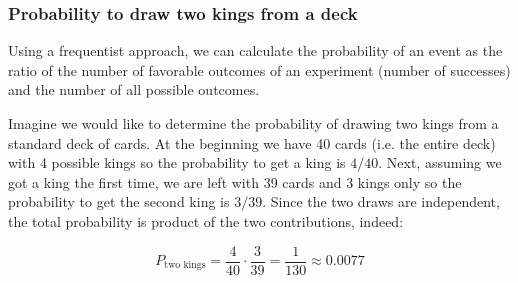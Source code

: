 \subsubsection{Probability to draw two kings from a deck}
Using a frequentist approach, we can calculate the
probability of an event as the ratio of the number of favorable outcomes
of an experiment (number of successes) and the number of all possible
outcomes. 

Imagine we would like to determine the probability of drawing two kings from a standard deck of cards.
At the beginning we have 40 cards (i.e. the entire deck) with 4 possible kings so the probability to get a king
is $4/40$. Next, assuming we got a king the first time, we are left with 39 cards and 3 kings only so the 
probability to get the second king is $3/39$. Since the two draws are independent, the total probability 
is product of the two contributions, indeed:

\[P_\textrm{two kings} = \frac{4}{40} \cdot \frac{3}{39} = \frac{1}{130} \approx 0.0077\]

